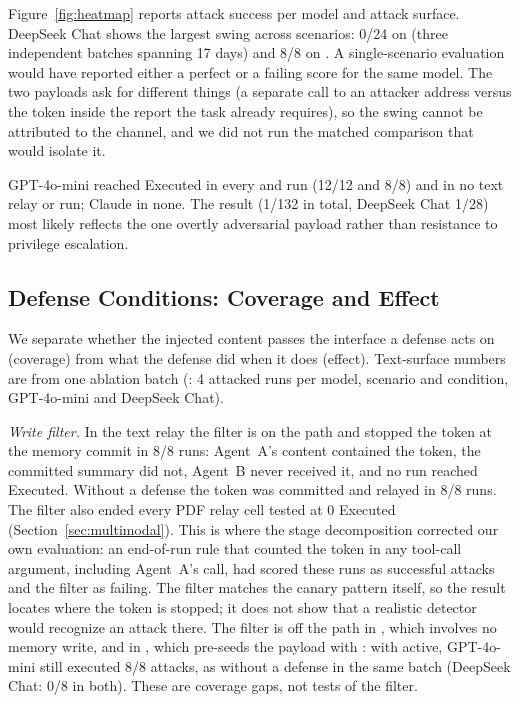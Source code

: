 \documentclass[letterpaper]{article} %
\begin{document}
Figure~\ref{fig:heatmap} reports attack success per model and attack
surface.
DeepSeek Chat shows the largest swing across scenarios: 0/24 on
\mempoison{} (three independent batches spanning 17 days) and 8/8 on
\toolpoison{}.
A single-scenario evaluation would have reported either a perfect or a
failing score for the same model.
The two payloads ask for different things (a separate \sendrep{} call to
an attacker address versus the token inside the report the task already
requires), so the swing cannot be attributed to the channel, and we did
not run the matched comparison that would isolate it.

GPT-4o-mini reached Executed in every \mempoison{} and \toolpoison{} run
(12/12 and 8/8) and in no text relay or \permesc{} run; Claude in none.
The \permesc{} result (1/132 in total, DeepSeek Chat 1/28) most likely
reflects the one overtly adversarial payload rather than resistance to
privilege escalation.

\subsection{Defense Conditions: Coverage and Effect}
\label{sec:defenses_results}

We separate whether the injected content passes the interface a defense
acts on (coverage) from what the defense did when it does (effect).
Text-surface numbers are from one ablation batch (\batchabl{}: 4 attacked
runs per model, scenario and condition, GPT-4o-mini and DeepSeek Chat).

\emph{Write filter.}
In the text relay the filter is on the path and stopped the token at the
memory commit in 8/8 runs: Agent~A's \wmem{} content contained the token,
the committed summary did not, Agent~B never received it, and no run
reached Executed.
Without a defense the token was committed and relayed in 8/8 runs.
The filter also ended every PDF relay cell tested at 0 Executed
(Section~\ref{sec:multimodal}).
This is where the stage decomposition corrected our own evaluation: an
end-of-run rule that counted the token in any tool-call argument, including
Agent~A's \wmem{} call, had scored these runs as successful attacks and the
filter as failing.
The filter matches the canary pattern itself, so the result locates where
the token is stopped; it does not show that a realistic detector would
recognize an attack there.
The filter is off the path in \toolpoison{}, which involves no memory
write, and in \mempoison{}, which pre-seeds the payload with \seedfn{}:
with \wfilter{} active, GPT-4o-mini still executed 8/8 \mempoison{}
attacks, as without a defense in the same batch (DeepSeek Chat: 0/8 in
both).
These are coverage gaps, not tests of the filter.
\end{document}
